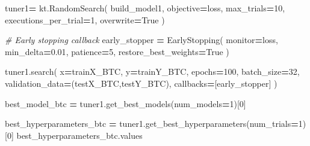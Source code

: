 \documentclass[
]{article}
\newenvironment{Shaded}{\begin{snugshade}}{\end{snugshade}}
\newcommand{\CommentTok}[1]{\textcolor[rgb]{0.56,0.35,0.01}{\textit{#1}}}
\newcommand{\DecValTok}[1]{\textcolor[rgb]{0.00,0.00,0.81}{#1}}
\newcommand{\FloatTok}[1]{\textcolor[rgb]{0.00,0.00,0.81}{#1}}
\newcommand{\NormalTok}[1]{#1}
\newcommand{\OperatorTok}[1]{\textcolor[rgb]{0.81,0.36,0.00}{\textbf{#1}}}
\newcommand{\StringTok}[1]{\textcolor[rgb]{0.31,0.60,0.02}{#1}}
\newcommand{\VariableTok}[1]{\textcolor[rgb]{0.00,0.00,0.00}{#1}}
\begin{document}
\begin{Shaded}
\begin{Highlighting}[]
\NormalTok{tuner1}\OperatorTok{=}\NormalTok{ kt.RandomSearch(}
\NormalTok{        build\_model1,}
\NormalTok{        objective}\OperatorTok{=}\StringTok{\textquotesingle{}loss\textquotesingle{}}\NormalTok{,}
\NormalTok{        max\_trials}\OperatorTok{=}\DecValTok{10}\NormalTok{,}
\NormalTok{        executions\_per\_trial}\OperatorTok{=}\DecValTok{1}\NormalTok{,}
\NormalTok{        overwrite}\OperatorTok{=}\VariableTok{True}
\NormalTok{        )}

\CommentTok{\# Early stopping callback}
\NormalTok{early\_stopper }\OperatorTok{=}\NormalTok{ EarlyStopping(}
\NormalTok{    monitor}\OperatorTok{=}\StringTok{\textquotesingle{}loss\textquotesingle{}}\NormalTok{,}
\NormalTok{    min\_delta}\OperatorTok{=}\FloatTok{0.01}\NormalTok{,}
\NormalTok{    patience}\OperatorTok{=}\DecValTok{5}\NormalTok{,}
\NormalTok{    restore\_best\_weights}\OperatorTok{=}\VariableTok{True}
\NormalTok{)}
\end{Highlighting}
\end{Shaded}

\begin{Shaded}
\begin{Highlighting}[]
\NormalTok{tuner1.search(}
\NormalTok{        x}\OperatorTok{=}\NormalTok{trainX\_BTC,}
\NormalTok{        y}\OperatorTok{=}\NormalTok{trainY\_BTC,}
\NormalTok{        epochs}\OperatorTok{=}\DecValTok{100}\NormalTok{,}
\NormalTok{        batch\_size}\OperatorTok{=}\DecValTok{32}\NormalTok{,}
\NormalTok{        validation\_data}\OperatorTok{=}\NormalTok{(testX\_BTC,testY\_BTC),}
\NormalTok{        callbacks}\OperatorTok{=}\NormalTok{[early\_stopper]}
\NormalTok{)}
\end{Highlighting}
\end{Shaded}

\begin{Shaded}
\begin{Highlighting}[]
\NormalTok{best\_model\_btc }\OperatorTok{=}\NormalTok{ tuner1.get\_best\_models(num\_models}\OperatorTok{=}\DecValTok{1}\NormalTok{)[}\DecValTok{0}\NormalTok{]}
\end{Highlighting}
\end{Shaded}

\begin{Shaded}
\begin{Highlighting}[]
\NormalTok{best\_hyperparameters\_btc }\OperatorTok{=}\NormalTok{ tuner1.get\_best\_hyperparameters(num\_trials}\OperatorTok{=}\DecValTok{1}\NormalTok{)[}\DecValTok{0}\NormalTok{]}
\NormalTok{best\_hyperparameters\_btc.values}
\end{Highlighting}
\end{Shaded}
\end{document}
